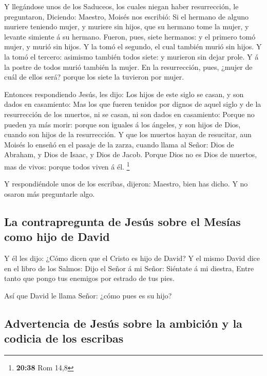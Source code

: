  Y llegándose unos de los Saduceos, los cuales niegan haber
resurrección, le preguntaron,  Diciendo: Maestro, Moisés
nos escribió: Si el hermano de alguno muriere teniendo mujer, y muriere
sin hijos, que su hermano tome la mujer, y levante simiente á su
hermano.  Fueron, pues, siete hermanos: y el primero tomó
mujer, y murió sin hijos.  Y la tomó el segundo, el cual
también murió sin hijos.  Y la tomó el tercero: asimismo
también todos siete: y murieron sin dejar prole.  Y á la
postre de todos murió también la mujer.  En la
resurrección, pues, ¿mujer de cuál de ellos será? porque los siete la
tuvieron por mujer.

 Entonces respondiendo Jesús, les dijo: Los hijos de este
siglo se casan, y son dados en casamiento:  Mas los que
fueren tenidos por dignos de aquel siglo y de la resurrección de los
muertos, ni se casan, ni son dados en casamiento:  Porque
no pueden ya más morir: porque son iguales á los ángeles, y son hijos de
Dios, cuando son hijos de la resurrección.  Y que los
muertos hayan de resucitar, aun Moisés lo enseñó en el pasaje de la
zarza, cuando llama al Señor: Dios de Abraham, y Dios de Isaac, y Dios
de Jacob.  Porque Dios no es Dios de muertos, mas de vivos:
porque todos viven á él. \footnote{\textbf{20:38} Rom 14,8}

 Y respondiéndole unos de los escribas, dijeron: Maestro,
bien has dicho.  Y no osaron más preguntarle algo.

\hypertarget{la-contrapregunta-de-jesuxfas-sobre-el-mesuxedas-como-hijo-de-david}{%
\subsection{La contrapregunta de Jesús sobre el Mesías como hijo de
David}\label{la-contrapregunta-de-jesuxfas-sobre-el-mesuxedas-como-hijo-de-david}}

 Y él les dijo: ¿Cómo dicen que el Cristo es hijo de David?
 Y el mismo David dice en el libro de los Salmos: Dijo el
Señor á mi Señor: Siéntate á mi diestra,  Entre tanto que
pongo tus enemigos por estrado de tus pies.

 Así que David le llama Señor: ¿cómo pues es su hijo?

\hypertarget{advertencia-de-jesuxfas-sobre-la-ambiciuxf3n-y-la-codicia-de-los-escribas}{%
\subsection{Advertencia de Jesús sobre la ambición y la codicia de los
escribas}\label{advertencia-de-jesuxfas-sobre-la-ambiciuxf3n-y-la-codicia-de-los-escribas}}


